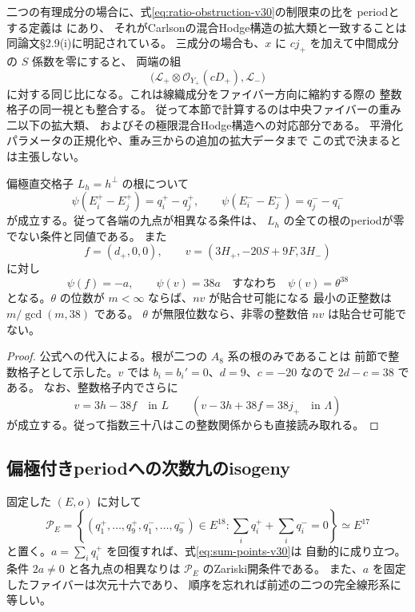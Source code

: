 \begin{remark}[混合Hodge構造との関係]
\label{rem:period-mhs-v30}
二つの有理成分の場合に、式\eqref{eq:ratio-obstruction-v30}の制限束の比を
periodとする定義は \cite[\S2.8]{KondoTypeII} にあり、
それがCarlsonの混合Hodge構造の拡大類と一致することは
同論文\S2.9(i)に明記されている。
三成分の場合も、$x$ に $c j_+$ を加えて中間成分の $S$ 係数を零にすると、
両端の組
\[
 \bigl(\mathscr L_+\otimes\mathcal O_{Y_+}(cD_+),\mathscr L_-\bigr)
\]
に対する同じ比になる。これは線織成分をファイバー方向に縮約する際の
整数格子の同一視とも整合する。
従って本節で計算するのは中央ファイバーの重み二以下の拡大類、
およびその極限混合Hodge構造への対応部分である。
平滑化パラメータの正規化や、重み三からの追加の拡大データまで
この式で決まるとは主張しない。
\end{remark}

\begin{corollary}[根のperiodとねじれ方向]
\label{cor:root-period-v30}
偏極直交格子 $L_h=h^\perp$ の根について
\begin{equation}
 \psi(E_i^+-E_j^+)=q_i^+-q_j^+,\qquad
 \psi(E_i^--E_j^-)=q_j^--q_i^-
 \label{eq:root-period-v30}
\end{equation}
が成立する。従って各端の九点が相異なる条件は、
$L_h$ の全ての根のperiodが零でない条件と同値である。
また
\[
 f=(d_+,0,0),\qquad
 v=(3H_+,-20S+9F,3H_-)
\]
に対し
\begin{equation}
 \psi(f)=-a,\qquad \psi(v)=38a
 \quad\text{すなわち}\quad
 \psi(v)=\theta^{38}
 \label{eq:theta38-v30}
\end{equation}
となる。$\theta$ の位数が $m<\infty$ ならば、$nv$ が貼合せ可能になる
最小の正整数は $m/\gcd(m,38)$ である。
$\theta$ が無限位数なら、非零の整数倍 $nv$ は貼合せ可能でない。
\end{corollary}

\begin{proof}
公式への代入による。根が二つの $A_8$ 系の根のみであることは
前節で整数格子として示した。$v$ では $b_i=b_i'=0$、$d=9$、$c=-20$
なので $2d-c=38$ である。
なお、整数格子内でさらに
\[
 v=3h-38f\quad\text{in }L
 \qquad
 (v-3h+38f=38j_+\quad\text{in }\Lambda)
\]
が成立する。従って指数三十八はこの整数関係からも直接読み取れる。
\end{proof}

\subsection{偏極付きperiodへの次数九のisogeny}

固定した $(E,o)$ に対して
\begin{equation}
 \mathcal P_E=
 \left\{(q_1^+,\ldots,q_9^+,q_1^-,\ldots,q_9^-)\in E^{18}:
         \sum_iq_i^++\sum_iq_i^-=0\right\}
 \simeq E^{17}
 \label{eq:point-abelian-v30}
\end{equation}
と置く。$a=\sum_iq_i^+$ を回復すれば、式\eqref{eq:sum-points-v30}は
自動的に成り立つ。条件 $2a\ne0$ と各九点の相異なりは
$\mathcal P_E$ のZariski開条件である。
また、$a$ を固定したファイバーは次元十六であり、
順序を忘れれば前述の二つの完全線形系に等しい。


